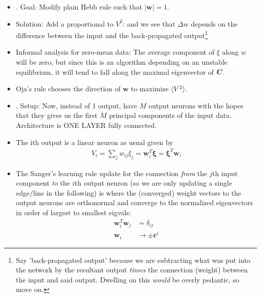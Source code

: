 \documentclass[12pt]{article}
\begin{document}
\begin{itemize}
\begin{itemize}
		
		\item {}. Goal: Modify plain Hebb rule such that $|\bm{w}| = 1$. 
		\item Solution: Add a  proportional to $V^2$:
		and we see that $\Delta w$ depends on the difference between the input and the back-propagated output\footnote{Say 'back-propagated output' because we are subtracting what was put into the network by the resultant output \textit{times} the connection (weight) between the input and said output. Dwelling on this \textit{would} be overly pedantic, so move on.}
		\item Informal analysis for zero-mean data: The average component of $\xi$ along $w$ will be zero, but since this is an algorithm depending on an unstable equilibrium, it will tend to fall along the maximal eigenvector of $\bm{C}_{}$. 
		\item Oja's rule chooses the direction of $\bm{w}$ to maximize $\langle V^2\rangle$. 
		
		
		\item {}. Setup: Now, instead of 1 output, have $M$ output neurons with the hopes that they gives us the first $M$ principal components of the input data. Architecture is ONE LAYER fully connected. 
		\item The ith output is a linear neuron as usual given by
		\begin{align}
			V_i = \sum_j w_{ij} \xi_j = \bm{w}_i^T \bm{\xi} = \bm{\xi}^T \bm{w}_i
		\end{align}
		\item The Sanger's learning rule update for the connection \textit{from} the $j$th input component \textit{to} the $i$th output neuron (so we are only updating a single edge/line in the following) is
		where the (converged) weight vectors to the output neurons are orthonormal and converge to the normalized eigenvectors in order of largest to smallest eigvals:
		\begin{align}
			\bm{w}_i^T \bm{w}_j &= \delta_{ij} \\
			\bm{w}_i &\rightarrow \pm \bm{c}^{i}
		\end{align}
	\end{itemize}
\end{itemize}
\end{document}
